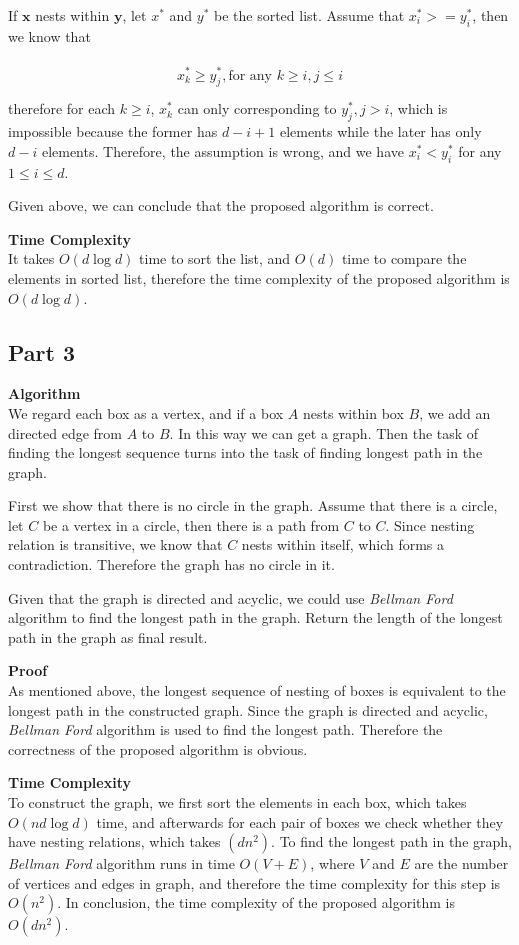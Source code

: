 \documentclass{article}
\newcommand{\Complexity}{\vspace{0.3cm} \noindent\textbf{Time Complexity} \\}
\newcommand{\Proof}{\vspace{0.3cm} \noindent\textbf{Proof} \\}
\newcommand{\Algorithm}{\textbf{Algorithm} \\}
\begin{document}
If $\mathbf{x}$ nests within $\mathbf{y}$, let $x^*$ and $y^*$ be the sorted list. Assume that
$x^*_i >= y^*_i$, then we know that 

\begin{align}
  \begin{split}  
  x^*_k \geq y^*_j, \text{for any } k \geq i, j \leq i  \\
  \end{split}
\end{align}
therefore for each $k \geq i$, $x^*_k$ can only corresponding to $y^*_j, j > i$, which is impossible
because the former has $d - i + 1$ elements while the later has only $d-i$ elements. Therefore,
the assumption is wrong, and we have $x^*_i < y^*_i$ for any $1 \leq i \leq d$.

Given above, we can conclude that the proposed algorithm is correct.

\Complexity
It takes $O(d\log d)$ time to sort the list, and $O(d)$ time to compare the elements in sorted
list, therefore the time complexity of the proposed algorithm is $O(d\log d)$.

\subsection*{Part 3}
\Algorithm
We regard each box as a vertex, and if a box $A$ nests within box $B$, we add an directed edge from $A$
to $B$. In this way we can get a graph. Then the task of finding the longest sequence turns into the
task of finding longest path in the graph.

First we show that there is no circle in the graph. Assume that there is a circle, let $C$ be a vertex in a
circle, then there is a path from $C$ to $C$. Since nesting relation is transitive, we know that $C$
nests within itself, which forms a contradiction. Therefore the graph has no circle in it.

Given that the graph is directed and acyclic, we could use \textit{Bellman Ford} algorithm to find the longest
path in the graph. Return the length of the longest path in the graph as final result.

\Proof
As mentioned above, the longest sequence of nesting of boxes is equivalent to the longest path in
the constructed graph. Since the graph is directed and acyclic, \textit{Bellman Ford} algorithm is
used to find the longest path. Therefore the correctness of the proposed algorithm is obvious.

\Complexity
To construct the graph, we first sort the elements in each box, which takes $O(nd\log d)$ time, and
afterwards for each pair of boxes we check whether they have nesting relations, which takes
$(dn^2)$. To find the longest path in the graph, \textit{Bellman Ford} algorithm runs in time
$O(V+E)$, where $V$ and $E$ are the number of vertices and edges in graph, and therefore the time
complexity for this step is $O(n^2)$. In conclusion, the time complexity of the proposed algorithm
is $O(dn^2)$.
\end{document}
